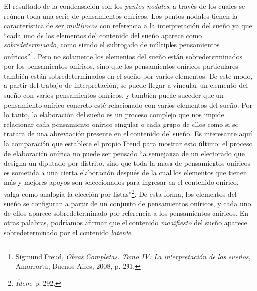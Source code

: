 El resultado de la condensación son los \emph{puntos nodales}, a través
de los cuales se reúnen toda una serie de pensamientos oníricos. Los
puntos nodales tienen la característica de ser \emph{multívocos} con
referencia a la interpretación del sueño ya que \enquote{cada uno de los
elementos del contenido del sueño aparece como \emph{sobredeterminado},
como siendo el subrogado de múltiples pensamientos oníricos}\footnote{Sigmund
  Freud, \emph{Obras Completas. Tomo IV: La interpretación de los
  sueños}, Amorrortu, Buenos Aires, 2008, p. 291.}. Pero no solamente
los elementos del sueño están sobredeterminados por los pensamientos
oníricos, sino que los pensamientos oníricos particulares también están
sobredeterminados en el sueño por varios elementos. De este modo, a
partir del trabajo de interpretación, se puede llegar a vincular un
elemento del sueño con varios pensamientos oníricos, y también puede
suceder que un pensamiento onírico concreto esté relacionado con varios
elementos del sueño. Por lo tanto, la elaboración del sueño es un
proceso complejo que nos impide relacionar cada pensamiento onírico
singular o cada grupo de ellos como si se tratara de una abreviación
presente en el contenido del sueño. Es interesante aquí la comparación
que establece el propio Freud para mostrar esto último: el proceso de
elaboración onírica no puede ser pensado \enquote{a semejanza de un electorado
que designa un diputado por distrito, sino que toda la masa de
pensamientos oníricos es sometida a una cierta elaboración después de la
cual los elementos que tienen más y mejores apoyos son seleccionados
para ingresar en el contenido onírico, valga como analogía la elección
por listas}\footnote{\emph{Ídem}, p. 292.}. De esta forma, los elementos
del sueño se configuran a partir de un conjunto de pensamientos
oníricos, y cada uno de ellos aparece sobredeterminado por referencia a
los pensamientos oníricos. En otras palabras, podríamos afirmar que el
contenido \emph{manifiesto} del sueño aparece sobredeterminado por el
contenido \emph{latente}.

